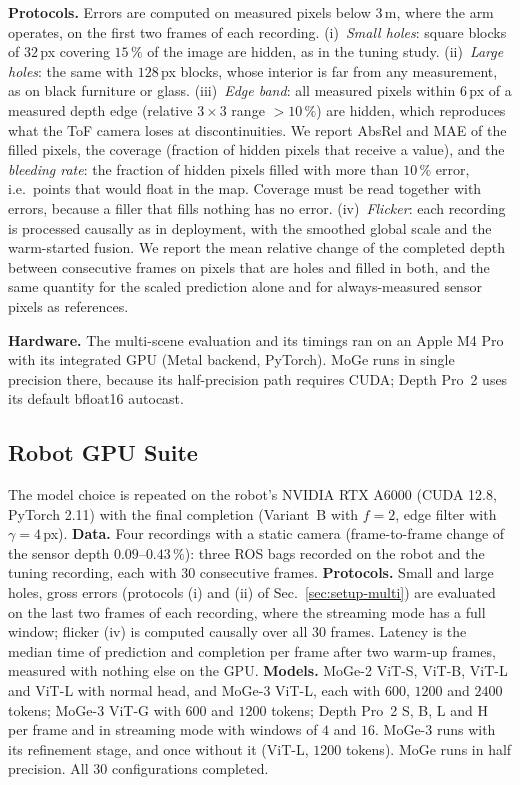 \documentclass[conference]{IEEEtran}
\begin{document}
\textbf{Protocols.} Errors are computed on measured pixels below \(3\,\)m,
where the arm operates, on the first two frames of each recording.
(i)~\emph{Small holes}: square blocks of \(32\,\)px covering \(15\,\%\) of the
image are hidden, as in the tuning study. (ii)~\emph{Large holes}: the same with
\(128\,\)px blocks, whose interior is far from any measurement, as on black
furniture or glass. (iii)~\emph{Edge band}: all measured pixels within \(6\,\)px
of a measured depth edge (relative \(3{\times}3\) range \(>10\,\%\)) are
hidden, which reproduces what the ToF camera loses at discontinuities. We
report AbsRel and MAE of the filled pixels, the coverage (fraction of hidden
pixels that receive a value), and the \emph{bleeding rate}: the fraction of
hidden pixels filled with more than \(10\,\%\) error, i.e.\ points that would
float in the map. Coverage must be read together with errors, because a filler
that fills nothing has no error. (iv)~\emph{Flicker}: each recording is
processed causally as in deployment, with the smoothed global scale and the
warm-started fusion. We report the mean relative change of the completed
depth between consecutive frames on pixels that are holes and filled in both,
and the same quantity for the scaled prediction alone and for always-measured
sensor pixels as references.

\textbf{Hardware.} The multi-scene evaluation and its timings ran on an Apple
M4 Pro with its integrated GPU (Metal backend, PyTorch). MoGe runs in single
precision there, because its half-precision path requires CUDA; Depth Pro~2
uses its default bfloat16 autocast.

\subsection{Robot GPU Suite}
\label{sec:setup-robot}

The model choice is repeated on the robot's NVIDIA RTX A6000 (CUDA 12.8,
PyTorch 2.11) with the final completion (Variant~B with \(f=2\), edge filter
with \(\gamma=4\,\)px). \textbf{Data.} Four recordings with a static camera
(frame-to-frame change of the sensor depth \(0.09\)--\(0.43\,\%\)): three ROS
bags recorded on the robot and the tuning recording, each with \(30\)
consecutive frames. \textbf{Protocols.} Small and large holes, gross errors
(protocols (i) and (ii) of Sec.~\ref{sec:setup-multi}) are evaluated on the last
two frames of each recording, where the streaming mode has a full window;
flicker (iv) is computed causally over all \(30\) frames. Latency is the median
time of prediction and completion per frame after two warm-up frames, measured
with nothing else on the GPU. \textbf{Models.} MoGe-2 ViT-S, ViT-B, ViT-L and
ViT-L with normal head, and MoGe-3 ViT-L, each with \(600\), \(1200\) and
\(2400\) tokens; MoGe-3 ViT-G with \(600\) and \(1200\) tokens; Depth Pro~2 S,
B, L and H per frame and in streaming mode with windows of \(4\) and \(16\).
MoGe-3 runs with its refinement stage, and once without it (ViT-L, \(1200\)
tokens). MoGe runs in half precision. All \(30\) configurations completed.
\end{document}
